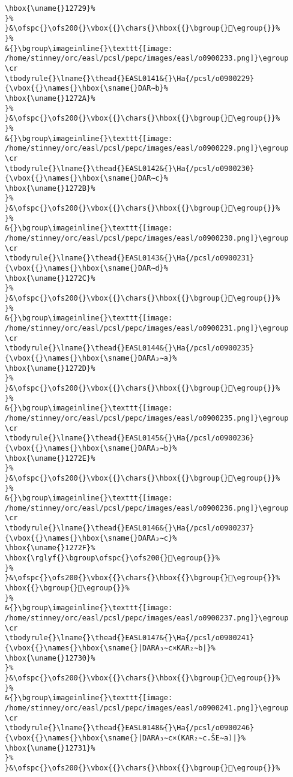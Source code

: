 \begin{verbatim}
\hbox{\uname{}12729}%
}%
}&\ofspc{}\ofs200{}\vbox{{}\chars{}\hbox{{}\bgroup{}𒜩\egroup{}}%
}%
&{}\bgroup\imageinline{}\texttt{[image: /home/stinney/orc/easl/pcsl/pepc/images/easl/o0900233.png]}\egroup
\cr
\tbodyrule{}\lname{}\thead{}EASL0141&{}\Ha{/pcsl/o0900229}{\vbox{{}\names{}\hbox{\sname{}DAR∼b}%
\hbox{\uname{}1272A}%
}%
}&\ofspc{}\ofs200{}\vbox{{}\chars{}\hbox{{}\bgroup{}𒜪\egroup{}}%
}%
&{}\bgroup\imageinline{}\texttt{[image: /home/stinney/orc/easl/pcsl/pepc/images/easl/o0900229.png]}\egroup
\cr
\tbodyrule{}\lname{}\thead{}EASL0142&{}\Ha{/pcsl/o0900230}{\vbox{{}\names{}\hbox{\sname{}DAR∼c}%
\hbox{\uname{}1272B}%
}%
}&\ofspc{}\ofs200{}\vbox{{}\chars{}\hbox{{}\bgroup{}𒜫\egroup{}}%
}%
&{}\bgroup\imageinline{}\texttt{[image: /home/stinney/orc/easl/pcsl/pepc/images/easl/o0900230.png]}\egroup
\cr
\tbodyrule{}\lname{}\thead{}EASL0143&{}\Ha{/pcsl/o0900231}{\vbox{{}\names{}\hbox{\sname{}DAR∼d}%
\hbox{\uname{}1272C}%
}%
}&\ofspc{}\ofs200{}\vbox{{}\chars{}\hbox{{}\bgroup{}𒜬\egroup{}}%
}%
&{}\bgroup\imageinline{}\texttt{[image: /home/stinney/orc/easl/pcsl/pepc/images/easl/o0900231.png]}\egroup
\cr
\tbodyrule{}\lname{}\thead{}EASL0144&{}\Ha{/pcsl/o0900235}{\vbox{{}\names{}\hbox{\sname{}DARA₃∼a}%
\hbox{\uname{}1272D}%
}%
}&\ofspc{}\ofs200{}\vbox{{}\chars{}\hbox{{}\bgroup{}𒜭\egroup{}}%
}%
&{}\bgroup\imageinline{}\texttt{[image: /home/stinney/orc/easl/pcsl/pepc/images/easl/o0900235.png]}\egroup
\cr
\tbodyrule{}\lname{}\thead{}EASL0145&{}\Ha{/pcsl/o0900236}{\vbox{{}\names{}\hbox{\sname{}DARA₃∼b}%
\hbox{\uname{}1272E}%
}%
}&\ofspc{}\ofs200{}\vbox{{}\chars{}\hbox{{}\bgroup{}𒜮\egroup{}}%
}%
&{}\bgroup\imageinline{}\texttt{[image: /home/stinney/orc/easl/pcsl/pepc/images/easl/o0900236.png]}\egroup
\cr
\tbodyrule{}\lname{}\thead{}EASL0146&{}\Ha{/pcsl/o0900237}{\vbox{{}\names{}\hbox{\sname{}DARA₃∼c}%
\hbox{\uname{}1272F}%
\hbox{\rglyf{}\bgroup\ofspc{}\ofs200{}𒜯\egroup{}}%
}%
}&\ofspc{}\ofs200{}\vbox{{}\chars{}\hbox{{}\bgroup{}𒜯\egroup{}}%
\hbox{{}\bgroup{}𒜲\egroup{}}%
}%
&{}\bgroup\imageinline{}\texttt{[image: /home/stinney/orc/easl/pcsl/pepc/images/easl/o0900237.png]}\egroup
\cr
\tbodyrule{}\lname{}\thead{}EASL0147&{}\Ha{/pcsl/o0900241}{\vbox{{}\names{}\hbox{\sname{}|DARA₃∼c×KAR₂∼b|}%
\hbox{\uname{}12730}%
}%
}&\ofspc{}\ofs200{}\vbox{{}\chars{}\hbox{{}\bgroup{}𒜰\egroup{}}%
}%
&{}\bgroup\imageinline{}\texttt{[image: /home/stinney/orc/easl/pcsl/pepc/images/easl/o0900241.png]}\egroup
\cr
\tbodyrule{}\lname{}\thead{}EASL0148&{}\Ha{/pcsl/o0900246}{\vbox{{}\names{}\hbox{\sname{}|DARA₃∼c×(KAR₂∼c.ŠE∼a)|}%
\hbox{\uname{}12731}%
}%
}&\ofspc{}\ofs200{}\vbox{{}\chars{}\hbox{{}\bgroup{}𒜱\egroup{}}%

\end{verbatim}

